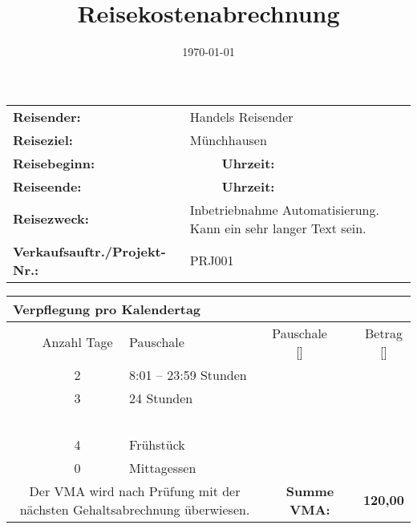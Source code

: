 \documentclass[a4paper,10pt]{scrartcl}
\title{Reisekostenabrechnung}
\author{\TravName}
\date{\today}
\makeatletter
\newcommand{\spcell}[2][c]{%
	\begin{tabular}[#1]{@{}c@{}}#2\end{tabular}}
\def \TravName      { Handels Reisender } %
\def \TravTarget    { Münchhausen }       %
\def \TravStartedOn { \formatdate{01}{01}{2014} } %
\def \TravStartedAt { \formattime{08}{45}{00} }   %
\def \TravEndedOn   { \formatdate{05}{01}{2014} } %
\def \TravEndedAt   { \formattime{18}{15}{00} }   %
\def \TravReason    { Inbetriebnahme Automatisierung. Kann ein sehr langer Text sein. }
\def \TravProjNr    { PRJ001 }
\def \NrShortDays  {2} %
\def \NrFullDays   {3} %
\def \NrBreakfasts {4} %
\def \NrLunches    {0} %
\makeatother
\begin{document}
\begin{table}
	\begin{tabularx}{\textwidth}{lXlX}
	\textbf{Reisender:}                  & \multicolumn{3}{l}{ \TravName }                     \\
	\textbf{Reiseziel:}                  & \multicolumn{3}{l}{ \TravTarget }                   \\
	\textbf{Reisebeginn:}                & \TravStartedOn & \textbf{Uhrzeit:} & \TravStartedAt \\
	\textbf{Reiseende:}                  & \TravEndedOn   & \textbf{Uhrzeit:} & \TravEndedAt   \\
        \textbf{Reisezweck:}                 & \multicolumn{3}{l}{ \TravReason }                   \\
	\textbf{Verkaufsauftr./Projekt-Nr.:} & \multicolumn{3}{l}{ \TravProjNr }
	\end{tabularx}
\end{table}

\begin{table}
	\begin{tabularx}{\textwidth}{|c|c|X|c|c|c|}
	\hline
	\multicolumn{6}{|l|}{\textbf{Verpflegung pro Kalendertag}} \\
	\hline
	\rowcolor{OrtGray}
	~ & Anzahl Tage   & Pauschale             & \spcell{Pauschale \\ {[\texteuro]}} & ~ & \spcell{Betrag \\ {[\texteuro]}}	\\ \hline
	~ & \NrShortDays  & 8:01 -- 23:59 Stunden & ~                                   & ~ & ~                                 \\ \cline{1-5}
	~ & \NrFullDays   & 24 Stunden            & ~                                   & ~ & ~                                 \\ \cline{1-5}
	~ & ~             & ~                     & ~                                   & ~ & ~                                 \\ \cline{1-5}
	~ & \NrBreakfasts & Frühstück             & ~                                   & ~ & ~                                 \\ \cline{1-5}
	~ & \NrLunches    & Mittagessen           & ~                                   & ~ & ~                                 \\ \hline
	\multicolumn{3}{|X}{Der VMA wird nach Prüfung mit der nächsten Gehaltsabrechnung überwiesen.} & \multicolumn{2}{c}{\textbf{Summe VMA:}} & \textbf{120,00 \texteuro} \\ 
	\hline
	\end{tabularx}
\end{table}
\end{document}
